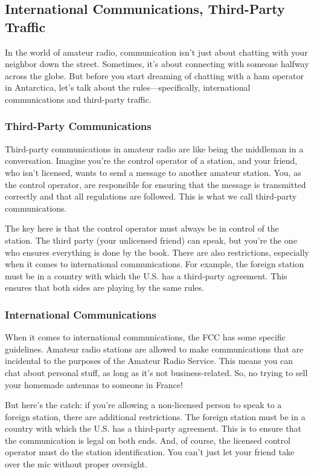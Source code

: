 \subsection{International Communications, Third-Party Traffic}
\label{subsec:intl-third-party}

In the world of amateur radio, communication isn't just about chatting with your neighbor down the street. Sometimes, it's about connecting with someone halfway across the globe. But before you start dreaming of chatting with a ham operator in Antarctica, let's talk about the rules—specifically, international communications and third-party traffic.

\subsubsection*{Third-Party Communications}

Third-party communications in amateur radio are like being the middleman in a conversation. Imagine you're the control operator of a station, and your friend, who isn't licensed, wants to send a message to another amateur station. You, as the control operator, are responsible for ensuring that the message is transmitted correctly and that all regulations are followed. This is what we call third-party communications.

The key here is that the control operator must always be in control of the station. The third party (your unlicensed friend) can speak, but you're the one who ensures everything is done by the book. There are also restrictions, especially when it comes to international communications. For example, the foreign station must be in a country with which the U.S. has a third-party agreement. This ensures that both sides are playing by the same rules.

\subsubsection*{International Communications}

When it comes to international communications, the FCC has some specific guidelines. Amateur radio stations are allowed to make communications that are incidental to the purposes of the Amateur Radio Service. This means you can chat about personal stuff, as long as it's not business-related. So, no trying to sell your homemade antennas to someone in France!

But here's the catch: if you're allowing a non-licensed person to speak to a foreign station, there are additional restrictions. The foreign station must be in a country with which the U.S. has a third-party agreement. This is to ensure that the communication is legal on both ends. And, of course, the licensed control operator must do the station identification. You can't just let your friend take over the mic without proper oversight.



